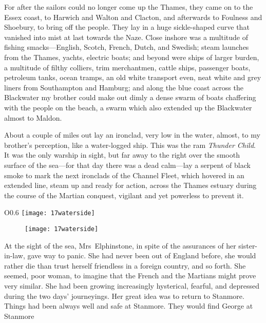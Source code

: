 For after the sailors could no longer come up the Thames, they came on to the Essex coast, to Harwich and Walton and Clacton, and afterwards to Foulness and Shoebury, to bring off the people. They lay in a huge sickle-shaped curve that vanished into mist at last towards the Naze. Close inshore was a multitude of fishing smacks—English, Scotch, French, Dutch, and Swedish; steam launches from the Thames, yachts, electric boats; and beyond were ships of larger burden, a multitude of filthy colliers, trim merchantmen, cattle ships, passenger boats, petroleum tanks, ocean tramps, an old white transport even, neat white and grey liners from Southampton and Hamburg; and along the blue coast across the Blackwater my brother could make out dimly a dense swarm of boats chaffering with the people on the beach, a swarm which also extended up the Blackwater almost to Maldon. 

About a couple of miles out lay an ironclad, very low in the water, almost, to my brother's perception, like a water-logged ship. This was the ram \textit{Thunder Child}. \label{broexp6} It was the only warship in sight, but far away to the right over the smooth surface of the sea—for that day there was a dead calm—lay a serpent of black smoke to mark the next ironclads of the Channel Fleet, which hovered in an extended line, steam up and ready for action, across the Thames estuary during the course of the Martian conquest, vigilant and yet powerless to prevent it.

\begin{letter}
	\begin{wrapfigure}{O}{0.6\textwidth}
	\centering
	\texttt{[image: 17waterside]}
	\end{wrapfigure}
\end{letter}
\begin{a4}
	\begin{figure}[tb]
	\centering
	\texttt{[image: 17waterside]}
	\end{figure}
\end{a4}

At the sight of the sea, Mrs~Elphinstone, in spite of the assurances of her sister-in-law, gave way to panic. She had never been out of England before, she would rather die than trust herself friendless in a foreign country, and so forth. She seemed, poor woman, to imagine that the French and the Martians might prove very similar. She had been growing increasingly hysterical, fearful, and depressed during the two days' journeyings. Her great idea was to return to Stanmore. Things had been always well and safe at Stanmore. They would find George at Stanmore\textellipsis

